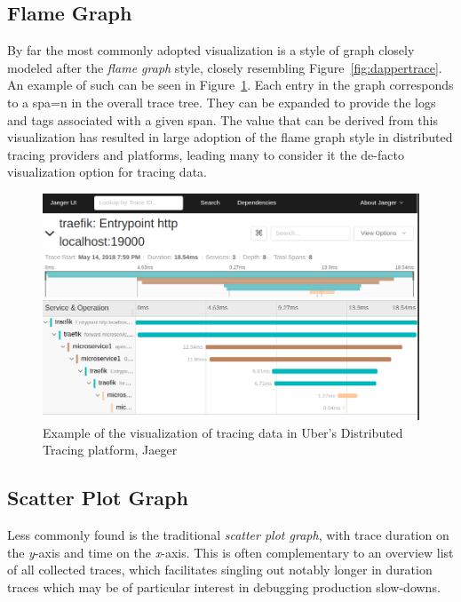 \documentclass[pdftex,titlepage]{article}
\begin{document}
        \subsection{Flame Graph}
        By far the most commonly adopted visualization 
        is a style of graph closely modeled after the \textit{flame graph} style, closely resembling Figure~\ref{fig:dappertrace}. An example 
        of such can be seen in Figure~\ref{fig:jaeger}. Each entry in the graph corresponds to a spa=n in the overall trace tree. They can be
        expanded to provide the logs and tags associated with a given span. The value that can be derived from this visualization has resulted
        in large adoption of the flame graph style in distributed tracing providers and platforms, leading many to consider it the de-facto 
        visualization option for tracing data.

        \medskip

        \begin{figure}[htb!]
            \centering
            \includegraphics[scale=0.35]{jaeger}
            \caption{Example of the visualization of tracing data in Uber's Distributed Tracing platform, Jaeger}
            \label{fig:jaeger}
        \end{figure}

        \subsection{Scatter Plot Graph}
        Less commonly found is the traditional \textit{scatter plot graph}, with trace duration on the \textit{y}-axis
        and time on the \textit{x}-axis. This is often complementary to an overview list of all collected traces, which
        facilitates singling out notably longer in duration traces which may be of particular interest in debugging production
        slow-downs. 
\end{document}
